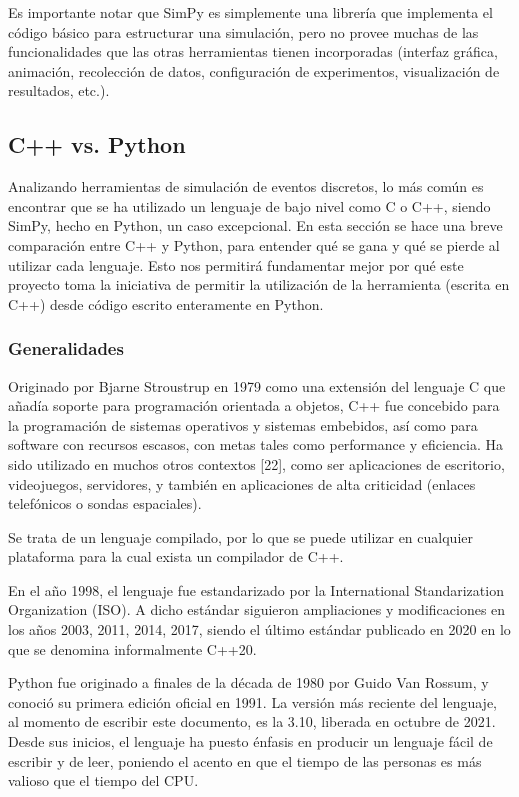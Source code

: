 \documentclass[]{article}
\begin{document}
Es importante notar que SimPy es simplemente una librería que implementa el
código básico para estructurar una simulación, pero no provee muchas de las
funcionalidades que las otras herramientas tienen incorporadas (interfaz
gráfica, animación, recolección de datos, configuración de experimentos,
visualización de resultados, etc.).

\subsection{C++ vs. Python}

Analizando herramientas de simulación de eventos discretos, lo más común es
encontrar que se ha utilizado un lenguaje de bajo nivel como C o C++, siendo
SimPy, hecho en Python, un caso excepcional. En esta sección se hace una breve
comparación entre C++ y Python, para entender qué se gana y qué se pierde al
utilizar cada lenguaje. Esto nos permitirá fundamentar mejor por qué este
proyecto toma la iniciativa de permitir la utilización de la herramienta
\omnetpp{} (escrita en C++) desde código escrito enteramente en Python.

\subsubsection{Generalidades}

Originado por Bjarne Stroustrup en 1979 como una extensión del lenguaje C que
añadía soporte para programación orientada a objetos, C++ fue concebido para la
programación de sistemas operativos y sistemas embebidos, así como para
software con recursos escasos, con metas tales como performance y eficiencia.
Ha sido utilizado en muchos otros contextos [22], como ser aplicaciones de
escritorio, videojuegos, servidores, y también en aplicaciones de alta
criticidad (enlaces telefónicos o sondas espaciales).

Se trata de un lenguaje compilado, por lo que se puede utilizar en cualquier
plataforma para la cual exista un compilador de C++.

En el año 1998, el lenguaje fue estandarizado por la International
Standarization Organization (ISO). A dicho estándar siguieron ampliaciones y
modificaciones en los años 2003, 2011, 2014, 2017, siendo el último estándar
publicado en 2020 en lo que se denomina informalmente C++20.

Python fue originado a finales de la década de 1980 por Guido Van Rossum, y
conoció su primera edición oficial en 1991. La versión más reciente del
lenguaje, al momento de escribir este documento, es la 3.10, liberada en
octubre de 2021. Desde sus inicios, el lenguaje ha puesto énfasis en producir
un lenguaje fácil de escribir y de leer, poniendo el acento en que el tiempo de
las personas es más valioso que el tiempo del CPU.
\end{document}
